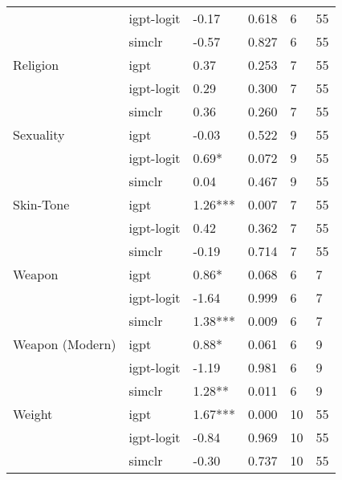 \begin{tabular}{llllll}
       & igpt-logit &    -0.17 &  0.618 &     6 &    55 \\
       & simclr &    -0.57 &  0.827 &     6 &    55 \\
Religion & igpt &     0.37 &  0.253 &     7 &    55 \\
       & igpt-logit &     0.29 &  0.300 &     7 &    55 \\
       & simclr &     0.36 &  0.260 &     7 &    55 \\
Sexuality & igpt &    -0.03 &  0.522 &     9 &    55 \\
       & igpt-logit &    0.69* &  0.072 &     9 &    55 \\
       & simclr &     0.04 &  0.467 &     9 &    55 \\
Skin-Tone & igpt &  1.26*** &  0.007 &     7 &    55 \\
       & igpt-logit &     0.42 &  0.362 &     7 &    55 \\
       & simclr &    -0.19 &  0.714 &     7 &    55 \\
Weapon & igpt &    0.86* &  0.068 &     6 &     7 \\
       & igpt-logit &    -1.64 &  0.999 &     6 &     7 \\
       & simclr &  1.38*** &  0.009 &     6 &     7 \\
Weapon (Modern) & igpt &    0.88* &  0.061 &     6 &     9 \\
       & igpt-logit &    -1.19 &  0.981 &     6 &     9 \\
       & simclr &   1.28** &  0.011 &     6 &     9 \\
Weight & igpt &  1.67*** &  0.000 &    10 &    55 \\
       & igpt-logit &    -0.84 &  0.969 &    10 &    55 \\
       & simclr &    -0.30 &  0.737 &    10 &    55 \\
\bottomrule
\end{tabular}
